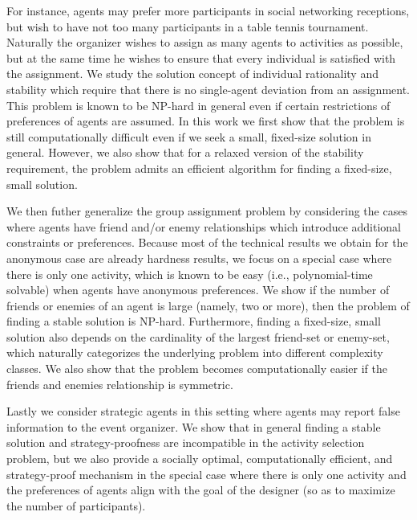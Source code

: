 For instance, agents may prefer more participants in social networking receptions, but wish to have not too many participants in a table tennis tournament. Naturally the organizer wishes to assign as many agents to activities as possible, but at the same time he wishes to ensure that every individual is satisfied with the assignment. We study the solution concept of individual rationality and stability which require that there is no single-agent deviation from an assignment. This problem is known to be NP-hard in general even if certain restrictions of preferences of agents are assumed. In this work we first show that the problem is still computationally difficult even if we seek a small, fixed-size solution in general. However, we also show that for a relaxed version of the stability requirement, the problem admits an efficient algorithm for finding a fixed-size, small solution. 

We then futher generalize the group assignment problem by considering the cases where agents have friend and/or enemy relationships which introduce additional constraints or preferences. Because most of the technical results we obtain for the anonymous case are already hardness results, we focus on a special case where there is only one activity, which is known to be easy (i.e., polynomial-time solvable) when agents have anonymous preferences. We show if the number of friends or enemies of an agent is large (namely, two or more), then the problem of finding a stable solution is NP-hard. Furthermore, finding a fixed-size, small solution also depends on the cardinality of the largest friend-set or enemy-set, which naturally categorizes the underlying problem into different complexity classes. We also show that the problem becomes computationally easier if the friends and enemies relationship is symmetric.

Lastly we consider strategic agents in this setting where agents may report false information to the event organizer. We show that in general finding a stable solution and strategy-proofness are incompatible in the activity selection problem, but we also provide a socially optimal, computationally efficient, and strategy-proof mechanism in the special case where there is only one activity and the preferences of agents align with the goal of the designer (so as to maximize the number of participants).
